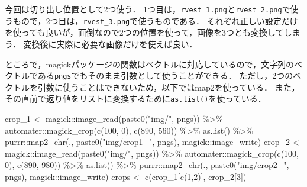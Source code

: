 \documentclass[
]{article}
\newenvironment{Shaded}{\begin{snugshade}}{\end{snugshade}}
\newcommand{\DecValTok}[1]{\textcolor[rgb]{0.00,0.00,0.81}{#1}}
\newcommand{\FunctionTok}[1]{\textcolor[rgb]{0.00,0.00,0.00}{#1}}
\newcommand{\NormalTok}[1]{#1}
\newcommand{\OtherTok}[1]{\textcolor[rgb]{0.56,0.35,0.01}{#1}}
\newcommand{\SpecialCharTok}[1]{\textcolor[rgb]{0.00,0.00,0.00}{#1}}
\newcommand{\StringTok}[1]{\textcolor[rgb]{0.31,0.60,0.02}{#1}}
\begin{document}
今回は切り出し位置として2つ使う．
1つ目は，\texttt{rvest\_1.png}と\texttt{rvest\_2.png}で使うもので，2つ目は，\texttt{rvest\_3.png}で使うものである．
それぞれ正しい設定だけを使っても良いが，面倒なので2つの位置を使って，画像を3つとも変換してしまう．
変換後に実際に必要な画像だけを使えば良い．

ところで，magickパッケージの関数はベクトルに対応しているので，文字列のベクトルである\texttt{pngs}でもそのまま引数として使うことができる．
ただし，2つのベクトルを引数に使うことはできないため，以下ではmap2を使っている．
また，その直前で返り値をリストに変換するために\texttt{as.list()}を使っている．

\begin{Shaded}
\begin{Highlighting}[]
\NormalTok{crop\_1 }\OtherTok{\textless{}{-}} 
\NormalTok{  magick}\SpecialCharTok{::}\FunctionTok{image\_read}\NormalTok{(}\FunctionTok{paste0}\NormalTok{(}\StringTok{"img/"}\NormalTok{, pngs)) }\SpecialCharTok{\%\textgreater{}\%}
\NormalTok{  automater}\SpecialCharTok{::}\FunctionTok{magick\_crop}\NormalTok{(}\FunctionTok{c}\NormalTok{(}\DecValTok{100}\NormalTok{, }\DecValTok{0}\NormalTok{), }\FunctionTok{c}\NormalTok{(}\DecValTok{890}\NormalTok{, }\DecValTok{560}\NormalTok{)) }\SpecialCharTok{\%\textgreater{}\%}
  \FunctionTok{as.list}\NormalTok{() }\SpecialCharTok{\%\textgreater{}\%}
\NormalTok{  purrr}\SpecialCharTok{::}\FunctionTok{map2\_chr}\NormalTok{(., }\FunctionTok{paste0}\NormalTok{(}\StringTok{"img/crop1\_"}\NormalTok{, pngs), magick}\SpecialCharTok{::}\NormalTok{image\_write)}
\NormalTok{crop\_2 }\OtherTok{\textless{}{-}} 
\NormalTok{  magick}\SpecialCharTok{::}\FunctionTok{image\_read}\NormalTok{(}\FunctionTok{paste0}\NormalTok{(}\StringTok{"img/"}\NormalTok{, pngs)) }\SpecialCharTok{\%\textgreater{}\%}
\NormalTok{  automater}\SpecialCharTok{::}\FunctionTok{magick\_crop}\NormalTok{(}\FunctionTok{c}\NormalTok{(}\DecValTok{100}\NormalTok{, }\DecValTok{0}\NormalTok{), }\FunctionTok{c}\NormalTok{(}\DecValTok{890}\NormalTok{, }\DecValTok{980}\NormalTok{)) }\SpecialCharTok{\%\textgreater{}\%}
  \FunctionTok{as.list}\NormalTok{() }\SpecialCharTok{\%\textgreater{}\%}
\NormalTok{  purrr}\SpecialCharTok{::}\FunctionTok{map2\_chr}\NormalTok{(., }\FunctionTok{paste0}\NormalTok{(}\StringTok{"img/crop2\_"}\NormalTok{, pngs), magick}\SpecialCharTok{::}\NormalTok{image\_write)}
\NormalTok{crops }\OtherTok{\textless{}{-}} \FunctionTok{c}\NormalTok{(crop\_1[}\FunctionTok{c}\NormalTok{(}\DecValTok{1}\NormalTok{,}\DecValTok{2}\NormalTok{)], crop\_2[}\DecValTok{3}\NormalTok{])}
\end{Highlighting}
\end{Shaded}
\end{document}
